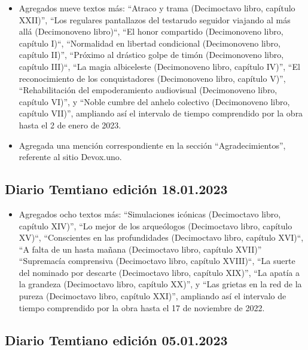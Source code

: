 \documentclass[
]{book}
\providecommand{\tightlist}{%
  \setlength{\itemsep}{0pt}\setlength{\parskip}{0pt}}
\begin{document}
\begin{itemize}
\item
  Agregados nueve textos más: ``Atraco y trama (Decimoctavo libro, capítulo XXII)'', ``Los regulares pantallazos del testarudo seguidor viajando al más allá (Decimonoveno libro)``, ``El honor compartido (Decimonoveno libro, capítulo I)``, ``Normalidad en libertad condicional (Decimonoveno libro, capítulo II)'', ``Próximo al drástico golpe de timón (Decimonoveno libro, capítulo III)``, ``La magia albiceleste (Decimonoveno libro, capítulo IV)'', ``El reconocimiento de los conquistadores (Decimonoveno libro, capítulo V)'', ``Rehabilitación del empoderamiento audiovisual (Decimonoveno libro, capítulo VI)'', y ``Noble cumbre del anhelo colectivo (Decimonoveno libro, capítulo VII)'', ampliando así el intervalo de tiempo comprendido por la obra hasta el 2 de enero de 2023.
\item
  Agregada una mención correspondiente en la sección ``Agradecimientos'', referente al sitio Devox.uno.
\end{itemize}

\hypertarget{diario-temtiano-ediciuxf3n-18.01.2023}{%
\subsection*{Diario Temtiano edición 18.01.2023}\label{diario-temtiano-ediciuxf3n-18.01.2023}}

\begin{itemize}
\tightlist
\item
  Agregados ocho textos más: ``Simulaciones icónicas (Decimoctavo libro, capítulo XIV)'', ``Lo mejor de los arqueólogos (Decimoctavo libro, capítulo XV)``, ``Conscientes en las profundidades (Decimoctavo libro, capítulo XVI)``, ``A falta de un hasta mañana (Decimoctavo libro, capítulo XVII)'' ``Supremacía comprensiva (Decimoctavo libro, capítulo XVIII)``, ``La suerte del nominado por descarte (Decimoctavo libro, capítulo XIX)'', ``La apatía a la grandeza (Decimoctavo libro, capítulo XX)'', y ``Las grietas en la red de la pureza (Decimoctavo libro, capítulo XXI)'', ampliando así el intervalo de tiempo comprendido por la obra hasta el 17 de noviembre de 2022.
\end{itemize}

\hypertarget{diario-temtiano-ediciuxf3n-05.01.2023}{%
\subsection*{Diario Temtiano edición 05.01.2023}\label{diario-temtiano-ediciuxf3n-05.01.2023}}
\end{document}

